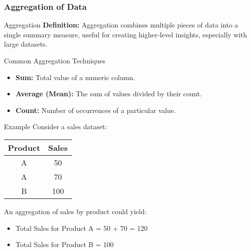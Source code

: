 \documentclass{beamer}
\begin{document}
\begin{frame}[fragile]
    \frametitle{Aggregation of Data}
    \begin{block}{Aggregation}
        \textbf{Definition:} Aggregation combines multiple pieces of data into a single summary measure, useful for creating higher-level insights, especially with large datasets.
    \end{block}

    \begin{block}{Common Aggregation Techniques}
        \begin{itemize}
            \item \textbf{Sum:} Total value of a numeric column.
            \item \textbf{Average (Mean):} The sum of values divided by their count.
            \item \textbf{Count:} Number of occurrences of a particular value.
        \end{itemize}
    \end{block}

    \begin{block}{Example}
        Consider a sales dataset: 
        \begin{tabular}{|c|c|}
            \hline
            Product & Sales \\
            \hline
            A       & 50    \\
            A       & 70    \\
            B       & 100   \\
            \hline
        \end{tabular}
        
        An aggregation of sales by product could yield:
        \begin{itemize}
            \item Total Sales for Product A = 50 + 70 = 120
            \item Total Sales for Product B = 100
        \end{itemize}
    \end{block}
\end{frame}
\end{document}
